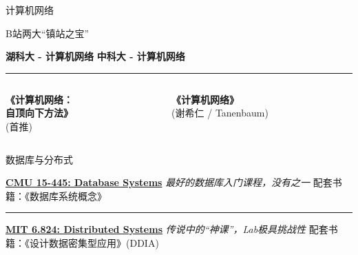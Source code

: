 \documentclass{beamer}
\newcommand{\hrefcol}[2]{\textcolor{cyan}{\href{#1}{#2}}}
\begin{document}
\begin{frame}{计算机网络}
    \begin{center}
        \Large B站两大“镇站之宝”
        \vspace{0.5cm}
        
        \huge \textbf{湖科大 - 计算机网络}
        \vspace{0.3cm}
        \huge \textbf{中科大 - 计算机网络}
    \end{center}
    
    \vfill
    \rule{\textwidth}{0.4pt}
    \vspace{0.3cm}

    \begin{columns}[T]
        \begin{column}{0.5\textwidth}
            \begin{center}
                \textbf{《计算机网络：} \\ \textbf{自顶向下方法》} \\ \small \alert{(首推)}
            \end{center}
        \end{column}
        \begin{column}{0.5\textwidth}
            \begin{center}
                \textbf{《计算机网络》} \\ \small (谢希仁 / Tanenbaum)
            \end{center}
        \end{column}
    \end{columns}
\end{frame}

\begin{frame}{数据库与分布式}
    \begin{center}
        \huge \hrefcol{https://15445.courses.cs.cmu.edu/fall2022/}{\textbf{CMU 15-445: Database Systems}}
        \large \textit{最好的数据库入门课程，没有之一}
        \large 配套书籍：《数据库系统概念》
    \end{center}
    
    \vfill
    \rule{0.8\textwidth}{0.4pt}
    \vfill

    \begin{center}
        \huge \hrefcol{https://pdos.csail.mit.edu/6.824/}{\textbf{MIT 6.824: Distributed Systems}}
        \large \textit{传说中的“神课”，Lab极具挑战性}
        \large 配套书籍：《设计数据密集型应用》(DDIA)
    \end{center}
\end{frame}
\end{document}
